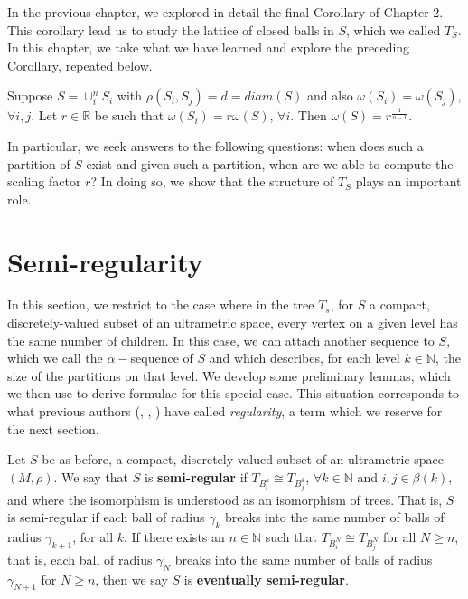 In the previous chapter, we explored in detail the final Corollary of Chapter 2. This corollary lead us to study the lattice of closed balls in $S$, which we called $T_S$. In this chapter, we take what we have learned and explore the preceding Corollary, repeated below.\\

\begin{corollary*}
	Suppose $S = \cup_i^n S_i$ with $\rho(S_i, S_j)=d=diam(S)$ and also $\omega(S_i)=\omega(S_j)$, $\forall i,j$.  Let $r \in \mathbb{R}$ be such that $\omega(S_i)=r\omega(S)$, $\forall i$. Then $\omega(S) = r^{\frac{1}{n-1}}$. 
\end{corollary*}

In particular, we seek answers to the following questions: when does such a partition of $S$ exist and given such a partition, when are we able to compute the scaling factor $r$? In doing so, we show that the structure of $T_S$ plays an important role. 


\section{Semi-regularity}
In this section, we restrict to the case where in the tree $T_s$, for $S$ a compact, discretely-valued subset of an ultrametric space, every vertex on a given level has the same number of children. In this case, we can attach another sequence to $S$, which we call the $\alpha-$sequence of $S$ and which describes, for each level $k \in \mathbb{N}$, the size of the partitions on that level. We develop some preliminary lemmas, which we then use to derive formulae for this special case. This situation corresponds to what previous authors (\cite{amice}, \cite{cef}, \cite{fp}) have called \textit{regularity}, a term which we reserve for the next section. 

\begin{definition}
Let $S$ be as before, a compact, discretely-valued subset of an ultrametric space $(M, \rho)$. We say that $S$ is \textbf{semi-regular} if $T_{B^k_i} \cong T_{B^k_j}$, $\forall k \in \mathbb{N}$ and  $i,j \in \beta(k)$, and where the isomorphism is understood as an isomorphism of trees. That is, $S$ is semi-regular if each ball of radius $\gamma_k$ breaks into the same number of balls of radius $\gamma_{k+1}$, for all $k$. If there exists an $n \in \mathbb{N}$ such that $T_{B^N_i} \cong T_{B^N_j}$ for all $N \geq n$, that is,  each ball of radius $\gamma_N$ breaks into the same number of balls of radius $\gamma_{N+1}$ for $N \geq n$, then we say $S$ is \textbf{eventually semi-regular}.
\end{definition}

